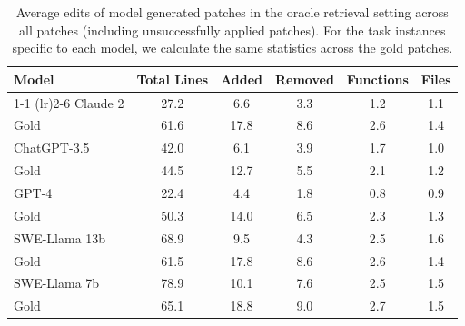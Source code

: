 \begin{table}[ht]
\centering
\caption{
Average edits of model generated patches in the oracle retrieval setting across all patches (including unsuccessfully applied patches).
For the task instances specific to each model, we calculate the same statistics across the gold patches.
}
\begin{tabular}{lccccc}
\toprule
    Model & Total Lines & Added & Removed & Functions & Files \\ \cmidrule(lr){1-1} \cmidrule(lr){2-6}  
    Claude 2 & 27.2 & 6.6 & 3.3 & 1.2 & 1.1 \\
    \quad Gold & 61.6 & 17.8 & 8.6 & 2.6 & 1.4 \\
\midrule
    ChatGPT-3.5 & 42.0 & 6.1 & 3.9 & 1.7 & 1.0 \\
    \quad Gold & 44.5 & 12.7 & 5.5 & 2.1 & 1.2 \\
\midrule
    GPT-4 & 22.4 & 4.4 & 1.8 & 0.8 & 0.9 \\
    \quad Gold & 50.3 & 14.0 & 6.5 & 2.3 & 1.3 \\
\midrule
    SWE-Llama 13b & 68.9 & 9.5 & 4.3 & 2.5 & 1.6 \\
    \quad Gold & 61.5 & 17.8 & 8.6 & 2.6 & 1.4 \\
\midrule
    SWE-Llama 7b & 78.9 & 10.1 & 7.6 & 2.5 & 1.5 \\
    \quad Gold & 65.1 & 18.8 & 9.0 & 2.7 & 1.5 \\
\bottomrule
\end{tabular}
\label{table:quantitative-analysis-gens-all}
\end{table}